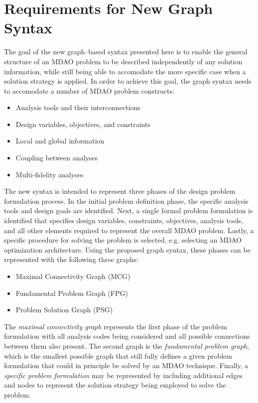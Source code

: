 \newcommand{\st}{ \ | \ }

\section{Requirements for New Graph Syntax}
  \label{s:requirements}
  The goal of the new graph--based syntax presented here is to enable the general structure of an MDAO problem to be described independently of any solution information, 
  while still being able to accomodate the more specific case when a solution 
  strategy is applied. In order to achieve this goal, 
  the graph syntax needs to accomodate a number of MDAO problem constructs: 
  \begin{itemize}
    \item Analysis tools and their interconnections
    \item Design variables, objectives, and constraints
    \item Local and global information
    \item Coupling between analyses
    \item Multi-fidelity analyses
  \end{itemize}

  The new syntax is intended to represent three phases of the design problem 
  formulation process. In the initial problem definition phase, the specific 
  analysis tools and design goals are identified. Next, a single formal problem 
  formulation is identified that specifies design variables, constraints, 
  objectives, analysis tools, and all other elements required to represent 
  the overall MDAO problem. Lastly, a specific procedure for solving the problem 
  is selected, e.g. selecting an MDAO optimization architecture. Using 
  the proposed graph syntax, these phases can be represented with the following 
  three graphs:

  \begin{itemize}
    \item Maximal Connectivity Graph (MCG)
    \item Fundamental Problem Graph (FPG)
    \item Problem Solution Graph (PSG)
  \end{itemize}

  The \emph{maximal connectivity graph} represents the first phase of the problem formulation with all 
  analysis codes being considered and all possible connections between them also present. The second graph 
  is the \emph{fundamental problem graph}, which is the smallest possible graph 
  that still fully defines a given problem formulation that could in principle be solved by an MDAO technique. Finally, a \emph{specific problem formulation} 
  may be represented by including additional edges and nodes to represent the 
  solution strategy being employed to solve the problem. 

